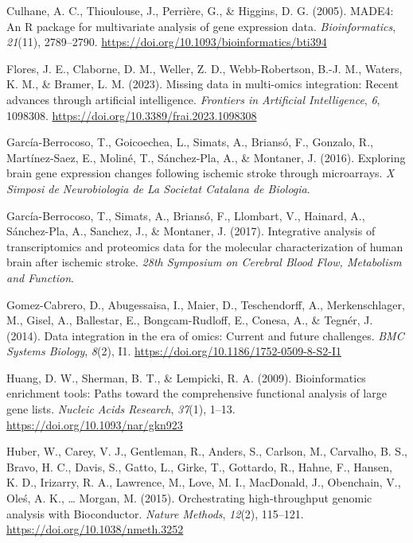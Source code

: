 \documentclass[a4paper, nobind]{templates/ociamthesis}
\newlength{\cslhangindent}
\newenvironment{CSLReferences}[2] %
 {%
  \setlength{\parindent}{0pt}
  \ifodd #1
  \let\oldpar\par
  \def\par{\hangindent=\cslhangindent\oldpar}
  \fi
  \setlength{\parskip}{1mm}
  \setlength{\baselineskip}{6mm}
 }%
 {}
\begin{document}
\begin{CSLReferences}{1}{0}
\leavevmode{}%
Culhane, A. C., Thioulouse, J., Perrière, G., \& Higgins, D. G. (2005). {MADE4}: An {R} package for multivariate analysis of gene expression data. \emph{Bioinformatics}, \emph{21}(11), 2789--2790. \url{https://doi.org/10.1093/bioinformatics/bti394}

\leavevmode{}%
Flores, J. E., Claborne, D. M., Weller, Z. D., Webb-Robertson, B.-J. M., Waters, K. M., \& Bramer, L. M. (2023). Missing data in multi-omics integration: {Recent} advances through artificial intelligence. \emph{Frontiers in Artificial Intelligence}, \emph{6}, 1098308. \url{https://doi.org/10.3389/frai.2023.1098308}

\leavevmode{}%
García-Berrocoso, T., Goicoechea, L., Simats, A., Briansó, F., Gonzalo, R., Martínez-Saez, E., Moliné, T., Sánchez-Pla, A., \& Montaner, J. (2016). Exploring brain gene expression changes following ischemic stroke through microarrays. \emph{X Simposi de Neurobiologia de La Societat Catalana de Biologia}.

\leavevmode{}%
García-Berrocoso, T., Simats, A., Briansó, F., Llombart, V., Hainard, A., Sánchez-Pla, A., Sanchez, J., \& Montaner, J. (2017). Integrative analysis of transcriptomics and proteomics data for the molecular characterization of human brain after ischemic stroke. \emph{28th Symposium on Cerebral Blood Flow, Metabolism and Function}.

\leavevmode{}%
Gomez-Cabrero, D., Abugessaisa, I., Maier, D., Teschendorff, A., Merkenschlager, M., Gisel, A., Ballestar, E., Bongcam-Rudloff, E., Conesa, A., \& Tegnér, J. (2014). Data integration in the era of omics: Current and future challenges. \emph{BMC Systems Biology}, \emph{8}(2), I1. \url{https://doi.org/10.1186/1752-0509-8-S2-I1}

\leavevmode{}%
Huang, D. W., Sherman, B. T., \& Lempicki, R. A. (2009). Bioinformatics enrichment tools: Paths toward the comprehensive functional analysis of large gene lists. \emph{Nucleic Acids Research}, \emph{37}(1), 1--13. \url{https://doi.org/10.1093/nar/gkn923}

\leavevmode{}%
Huber, W., Carey, V. J., Gentleman, R., Anders, S., Carlson, M., Carvalho, B. S., Bravo, H. C., Davis, S., Gatto, L., Girke, T., Gottardo, R., Hahne, F., Hansen, K. D., Irizarry, R. A., Lawrence, M., Love, M. I., MacDonald, J., Obenchain, V., Oleś, A. K., \ldots{} Morgan, M. (2015). Orchestrating high-throughput genomic analysis with {Bioconductor}. \emph{Nature Methods}, \emph{12}(2), 115--121. \url{https://doi.org/10.1038/nmeth.3252}


\end{CSLReferences}
\end{document}
